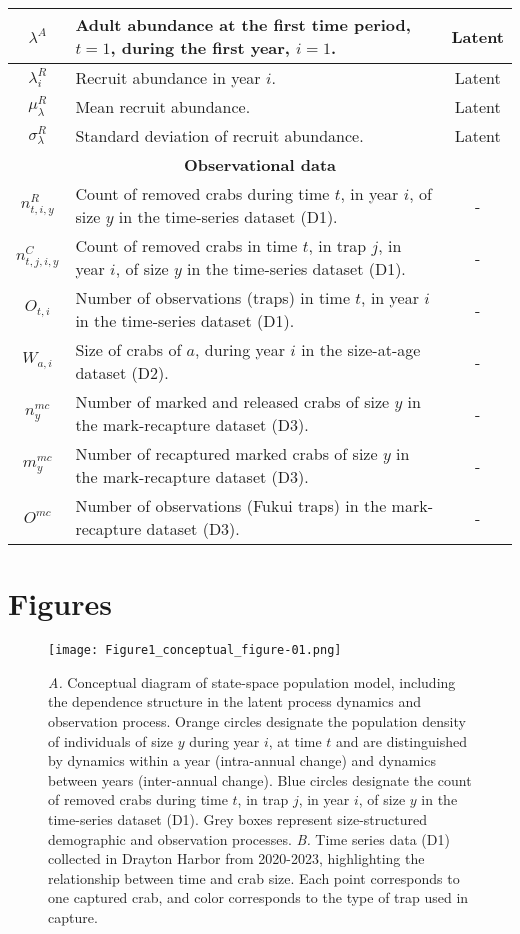 \documentclass{article}
\begin{document}
\begin{longtable}{||c p{9cm} c||}
 \hline
 $\lambda^A$ & Adult abundance at the first time period, $t=1$, during the first year, $i=1$. & Latent \\
 \hline
 $\lambda^R_i$ & Recruit abundance in year $i$. & Latent \\
 \hline
 $\mu^R_{\lambda}$ & Mean recruit abundance. & Latent \\
 \hline
 $\sigma^R_{\lambda}$ & Standard deviation of recruit abundance. & Latent \\
 \hline\hline
 \multicolumn{3}{||c||}{\textbf{Observational data}} \\ 
 \hline
 $n^R_{t,i,y}$ & Count of removed crabs during time $t$, in year $i$, of size $y$ in the time-series dataset (D1). & - \\ 
 \hline
 $n^C_{t,j,i,y}$ & Count of removed crabs in time $t$, in trap $j$, in year $i$, of size $y$ in the time-series dataset (D1). & - \\
 \hline
 $O_{t,i}$ & Number of observations (traps) in time $t$, in year $i$ in the time-series dataset (D1). & - \\
 \hline
 $W_{a,i}$ & Size of crabs of $a$, during year $i$ in the size-at-age dataset (D2). & - \\
 \hline
 $n^{mc}_{y}$ & Number of marked and released crabs of size $y$ in the mark-recapture dataset (D3). & - \\
 \hline
 $m^{mc}_{y}$ & Number of recaptured marked crabs of size $y$ in the mark-recapture dataset (D3). & - \\
 \hline
 $O^{mc}$ & Number of observations (Fukui traps) in the mark-recapture dataset (D3). & - \\
 \hline
\end{longtable}

\section{Figures}

\begin{figure}[H]
    \centering
    \texttt{[image: Figure1\_conceptual\_figure-01.png]}
    \caption{\textit{A.} Conceptual diagram of state-space population model, including the dependence structure in the latent process dynamics and observation process. Orange circles designate the population density of individuals of size $y$ during year $i$, at time $t$ and are distinguished by dynamics within a year (intra-annual change) and dynamics between years (inter-annual change). Blue circles designate the count of removed crabs during time $t$, in trap $j$, in year $i$, of size $y$ in the time-series dataset (D1). Grey boxes represent size-structured demographic and observation processes. \textit{B.} Time series data (D1) collected in Drayton Harbor from 2020-2023, highlighting the relationship between time and crab size. Each point corresponds to one captured crab, and color corresponds to the type of trap used in capture.}
\end{figure}
\end{document}
